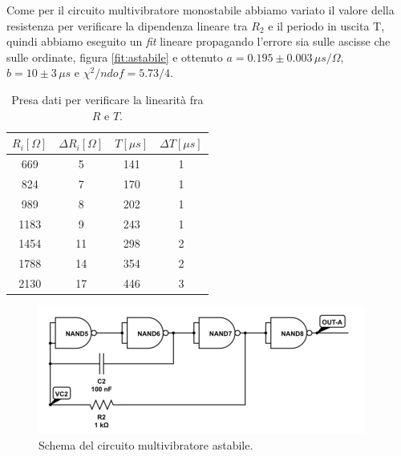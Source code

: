 \documentclass[10pt,a4paper]{article}
\begin{document}
Come per il circuito multivibratore monostabile abbiamo variato il valore della resistenza per verificare la dipendenza lineare tra $R_2$ e il periodo in uscita T, quindi abbiamo eseguito un \emph{fit} lineare propagando l'errore sia sulle ascisse che sulle ordinate, figura \ref{fit:astabile} e ottenuto $a=0.195\pm0.003\,\mu s/\Omega$, $b=10\pm3\,\mu s$ e $\chi^2/ndof=5.73/4$.


\begin{table}[!htb]
\centering
\begin{tabular}{|c|c|c|c|}
\hline 
$R_i [\Omega]$ & $\Delta R_i [\Omega]$ & $T [\mu s]$ & $\Delta T [\mu s]$\\
\hline
 669 & 5 & 141  & 1\\ 
\hline
 824 &  7 & 170 & 1\\ 
\hline 
 989 &  8 & 202 & 1\\ 
\hline
 1183 &  9 & 243 & 1\\ 
\hline
 1454 &  11 & 298 & 2\\ 
\hline
 1788 & 14 & 354 & 2 \\
\hline
 2130 & 17 & 446 & 3\\
\end{tabular} 
\caption{Presa dati per verificare la linearità fra $R$ e $T$.\label{tab:astabile}}
\end{table}

\begin{figure}[!htb]
  \centering
  \includegraphics[scale=0.5]{astabile.png}
\caption{Schema del circuito multivibratore astabile.\label{fig:astabile}}
\end{figure}
\end{document}

